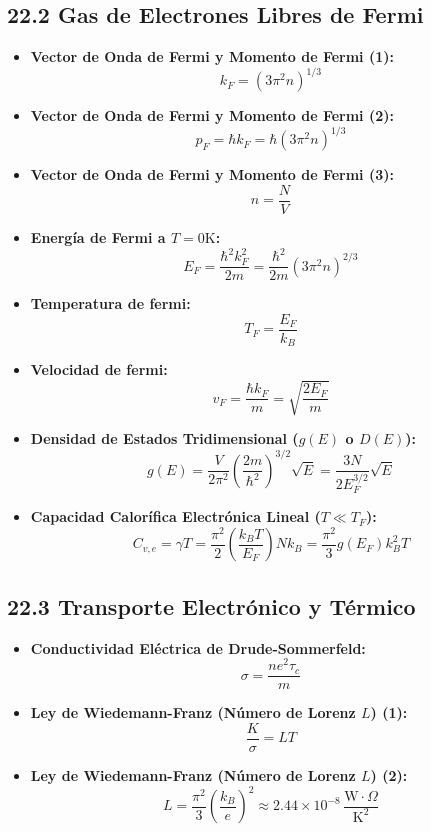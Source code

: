 \documentclass[11pt,a4paper]{article}
\begin{document}
\subsection*{22.2 Gas de Electrones Libres de Fermi}

\begin{itemize}
  \item \textbf{Vector de Onda de Fermi y Momento de Fermi (1):}
  \[
    k_F = (3\pi^2 n)^{1/3}
  \]
  \item \textbf{Vector de Onda de Fermi y Momento de Fermi (2):}
  \[
    p_F = \hbar k_F = \hbar (3\pi^2 n)^{1/3}
  \]
  \item \textbf{Vector de Onda de Fermi y Momento de Fermi (3):}
  \[
    n = \frac{N}{V}
  \]
  \item \textbf{Energía de Fermi a $T = 0\mathrm{ K}$:}
  \[
    E_F = \frac{\hbar^2 k_F^2}{2m} = \frac{\hbar^2}{2m}(3\pi^2 n)^{2/3}
  \]
  \item \textbf{Temperatura de fermi:}
  \[
    T_F = \frac{E_F}{k_B}
  \]
  \item \textbf{Velocidad de fermi:}
  \[
    v_F = \frac{\hbar k_F}{m} = \sqrt{\frac{2E_F}{m}}
  \]
  \item \textbf{Densidad de Estados Tridimensional ($g(E)$ o $D(E)$):}
  \[
    g(E) = \frac{V}{2\pi^2}\left( \frac{2m}{\hbar^2} \right)^{3/2} \sqrt{E} = \frac{3N}{2E_F^{3/2}}\sqrt{E}
  \]
  \item \textbf{Capacidad Calorífica Electrónica Lineal ($T \ll T_F$):}
  \[
    C_{v,e} = \gamma T = \frac{\pi^2}{2}\left( \frac{k_B T}{E_F} \right) N k_B = \frac{\pi^2}{3} g(E_F) k_B^2 T
  \]
\end{itemize}

\subsection*{22.3 Transporte Electrónico y Térmico}

\begin{itemize}
  \item \textbf{Conductividad Eléctrica de Drude-Sommerfeld:}
  \[
    \sigma = \frac{n e^2 \tau_c}{m}
  \]
  \item \textbf{Ley de Wiedemann-Franz (Número de Lorenz $L$) (1):}
  \[
    \frac{K}{\sigma} = L T
  \]
  \item \textbf{Ley de Wiedemann-Franz (Número de Lorenz $L$) (2):}
  \[
    L = \frac{\pi^2}{3}\left( \frac{k_B}{e} \right)^2 \approx 2.44 \times 10^{-8} \, \frac{\mathrm{W}\cdot\Omega}{\mathrm{K}^2}
  \]
\end{itemize}
\end{document}
